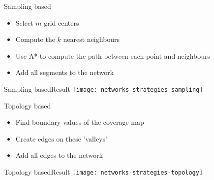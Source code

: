 \begin{frame}{Sampling based}
	\begin{itemize}
		\item Select $m$ grid centers
		\item Compute the $k$ nearest neighbours
		\item Use A* to compute the path between each point and neighbours
		\item Add all segments to the network
	\end{itemize}
\end{frame}

\begin{frame}{Sampling based}{Result}
	\centering
	\texttt{[image: networks-strategies-sampling]}
\end{frame}

\begin{frame}{Topology based}
	\begin{itemize}
		\item Find boundary values of the coverage map
		\item Create edges on these 'valleys'
		\item Add all edges to the network
	\end{itemize}
\end{frame}

\begin{frame}{Topology based}{Result}
	\centering
	\texttt{[image: networks-strategies-topology]}
\end{frame}

